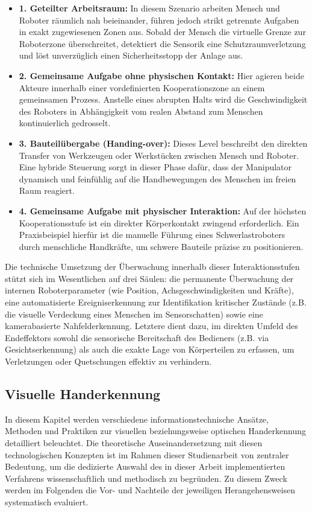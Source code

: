 \begin{itemize}
	\item \textbf{1. Geteilter Arbeitsraum:} In diesem Szenario arbeiten Mensch und Roboter räumlich nah beieinander, führen jedoch strikt getrennte Aufgaben in exakt zugewiesenen Zonen aus. Sobald der Mensch die virtuelle Grenze zur Roboterzone überschreitet, detektiert die Sensorik eine Schutzraumverletzung und löst unverzüglich einen Sicherheitsstopp der Anlage aus.
	\item \textbf{2. Gemeinsame Aufgabe ohne physischen Kontakt:} Hier agieren beide Akteure innerhalb einer vordefinierten Kooperationszone an einem gemeinsamen Prozess. Anstelle eines abrupten Halts wird die Geschwindigkeit des Roboters in Abhängigkeit vom realen Abstand zum Menschen kontinuierlich gedrosselt.
	\item \textbf{3. Bauteilübergabe (Handing-over):} Dieses Level beschreibt den direkten Transfer von Werkzeugen oder Werkstücken zwischen Mensch und Roboter. Eine hybride Steuerung sorgt in dieser Phase dafür, dass der Manipulator dynamisch und feinfühlig auf die Handbewegungen des Menschen im freien Raum reagiert.
	\item \textbf{4. Gemeinsame Aufgabe mit physischer Interaktion:} Auf der höchsten Kooperationsstufe ist ein direkter Körperkontakt zwingend erforderlich. Ein Praxisbeispiel hierfür ist die manuelle Führung eines Schwerlastroboters durch menschliche Handkräfte, um schwere Bauteile präzise zu positionieren. 
\end{itemize}
Die technische Umsetzung der Überwachung innerhalb dieser Interaktionsstufen stützt sich im Wesentlichen auf drei Säulen: die permanente Überwachung der internen Roboterparameter (wie Position, Achsgeschwindigkeiten und Kräfte), eine automatisierte Ereigniserkennung zur Identifikation kritischer Zustände (z.B. die visuelle Verdeckung eines Menschen im Sensorschatten) sowie eine kamerabasierte Nahfelderkennung. Letztere dient dazu, im direkten Umfeld des Endeffektors sowohl die sensorische Bereitschaft des Bedieners (z.B. via Gesichtserkennung) als auch die exakte Lage von Körperteilen zu erfassen, um Verletzungen oder Quetschungen effektiv zu verhindern.

\subsection{Visuelle Handerkennung}

In diesem Kapitel werden verschiedene informationstechnische Ansätze, Methoden und Praktiken zur visuellen beziehungsweise optischen Handerkennung detailliert beleuchtet. Die theoretische Auseinandersetzung mit diesen technologischen Konzepten ist im Rahmen dieser Studienarbeit von zentraler Bedeutung, um die dedizierte Auswahl des in dieser Arbeit implementierten Verfahrens wissenschaftlich und methodisch zu begründen. Zu diesem Zweck werden im Folgenden die Vor- und Nachteile der jeweiligen Herangehensweisen systematisch evaluiert.

